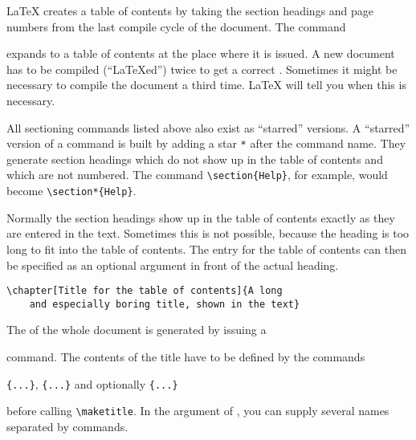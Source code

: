 \LaTeX{} creates a table of contents by taking the section headings
and page numbers from the last compile cycle of the document. The command 
\begin{lscommand} 
\end{lscommand} 
\noindent expands to a table of contents at the place where it
is issued. A new
document has to be compiled (``\LaTeX ed'') twice to get a
correct . Sometimes it might be
necessary to compile the document a third time. \LaTeX{} will tell you
when this is necessary.

All sectioning commands listed above also exist as ``starred''
versions.  A ``starred'' version of a command is built by adding a
star \verb|*| after the command name.  They generate section headings
which do not show up in the table of contents and which are not
numbered. The command \verb|\section{Help}|, for example, would become
\verb|\section*{Help}|.

Normally the section headings show up in the table of contents exactly
as they are entered in the text. Sometimes this is not possible,
because the heading is too long to fit into the table of contents. The
entry for the table of contents can then be specified as an
optional argument in front of the actual heading.

\begin{code}
\verb|\chapter[Title for the table of contents]{A long|\\
\verb|    and especially boring title, shown in the text}|
\end{code} 

The  of the whole document is generated by issuing a 
\begin{lscommand}
\end{lscommand}
\noindent command. The contents of the title have to be defined by the commands
\begin{lscommand}
\verb|{...}|, \verb|{...}| 
and optionally \verb|{...}| 
\end{lscommand}
\noindent before calling \verb|\maketitle|. In the argument of , you can
supply several names separated by  commands. 

